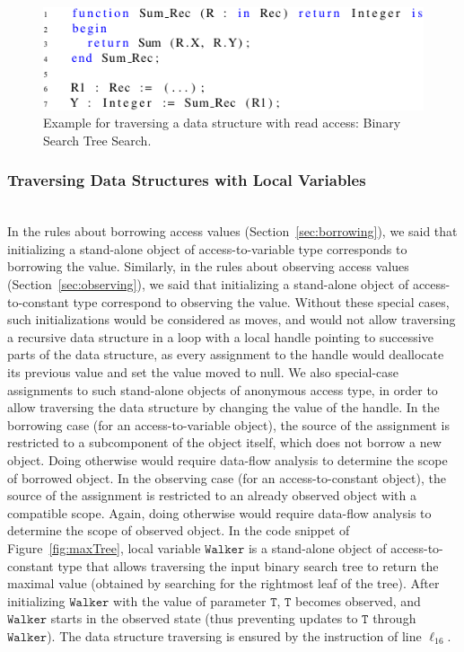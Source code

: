 \documentclass{llncs}
\newcommand\var[1]{\ensuremath{\mathtt{#1}}}
\begin{document}
\begin{figure}[htb!]
\centering
  \captionsetup{justification=centering,margin=0.6cm}
   \includegraphics[]{observingComposite}
   \caption{Example for traversing a data structure with read access: Binary Search Tree Search.}
   \label{fig:observingComposite}
\end{figure}



\subsubsection{Traversing Data Structures with Local Variables}
\ \\

In the rules about borrowing access values (Section~\ref{sec:borrowing}), we said that initializing a stand-alone object of access-to-variable type corresponds to
borrowing the value. Similarly, in the rules about observing access values (Section~\ref{sec:observing}), we said that initializing a stand-alone object of
access-to-constant type correspond to observing the value. Without these special cases, such initializations would be considered as moves, and would not allow
traversing a recursive data structure in a loop with a local handle pointing to successive parts of the data structure, as every assignment to the handle would
deallocate its previous value and set the value moved to null.
We also special-case assignments to such stand-alone objects of anonymous access type, in order to allow traversing the data structure by changing the value of the handle.
In the borrowing case (for an access-to-variable object), the source of the assignment is restricted to a subcomponent of the object itself, which does not borrow a new object.
Doing otherwise would require data-flow analysis to determine the scope of borrowed object. In the observing case (for an access-to-constant object), the source of
the assignment is restricted to an already observed object with a compatible scope. Again, doing otherwise would require data-flow analysis to determine the scope of observed object.
In the code snippet of Figure~\ref{fig:maxTree}, local variable \var{Walker} is a stand-alone object of access-to-constant type that allows traversing the input binary
search tree to return the maximal value (obtained by searching for the rightmost leaf of the tree). After initializing \var{Walker} with the value of parameter \var{T},
\var{T} becomes observed, and \var{Walker} starts in the observed state (thus preventing updates to \var{T} through \var{Walker}). The data structure traversing is ensured by the instruction
of line $\ell_{16}$. 
\end{document}
